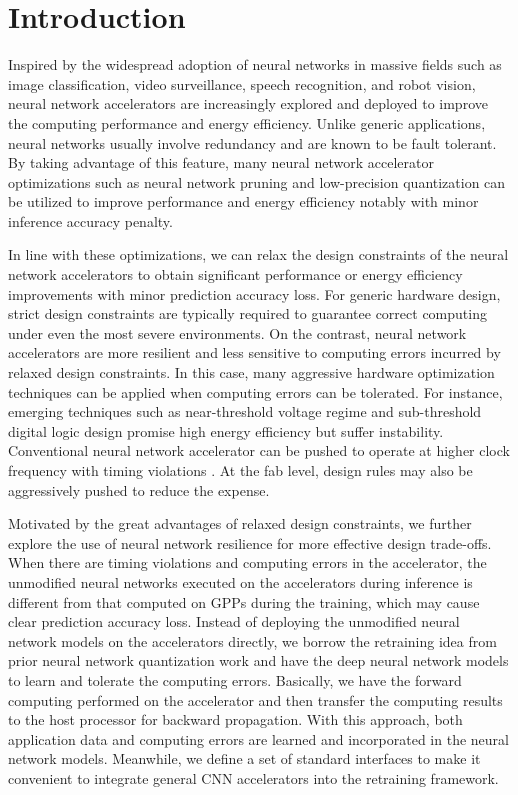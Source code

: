 \section{Introduction} \label{sec:intro}
Inspired by the widespread adoption of neural networks in massive fields such as image classification, 
video surveillance, speech recognition, and robot vision, neural network accelerators 
\cite{Zhang2015_9,Qiu2016_10,deepburing_12,DiCecco_4,Zeng2018_18} 
are increasingly explored and deployed to improve the computing performance and energy efficiency.
Unlike generic applications, neural networks usually involve redundancy and are known to be 
fault tolerant\cite{Reagen2016}. By taking advantage of this feature, many neural network accelerator optimizations 
such as neural network pruning and low-precision quantization can be utilized to improve 
performance and energy efficiency notably with minor inference accuracy penalty\cite{Han2016DeepCC}. 

In line with these optimizations, we can relax the design constraints of 
the neural network accelerators to obtain significant performance or energy efficiency 
improvements with minor prediction accuracy loss. 
For generic hardware design, strict design constraints are typically required to 
guarantee correct computing under even the most severe environments. On the contrast, 
neural network accelerators are more resilient and less sensitive to computing 
errors incurred by relaxed design constraints. In this case, many 
aggressive hardware optimization techniques can be applied when computing errors can be tolerated. 
For instance, emerging techniques such as  near-threshold voltage regime\cite{RG2010NT} 
and sub-threshold digital logic design\cite{BH2005,B2006} promise high energy efficiency 
but suffer instability\cite{Pu2010NT}. Conventional neural network accelerator 
can be pushed to operate at higher clock frequency with timing violations
\cite{overclock_3,Paceline_15}. At the fab level, design rules may also 
be aggressively pushed to reduce the expense. 

Motivated by the great advantages of relaxed design constraints,
we further explore the use of neural network resilience for more 
effective design trade-offs. When there are timing violations
and computing errors in the accelerator, the unmodified neural networks 
executed on the accelerators during inference is different 
from that computed on GPPs during the training, which may cause clear 
prediction accuracy loss. Instead of deploying the unmodified neural 
network models on the accelerators directly, we borrow the retraining 
idea from prior neural network quantization work \cite{Hwang2014_17,Matthieu2014_8} 
and have the deep neural network models to learn and tolerate the computing errors.  
Basically, we have the forward computing performed on the accelerator and 
then transfer the computing results to the host processor for 
backward propagation. With this approach, both application data and computing 
errors are learned and incorporated in the neural network models.  
Meanwhile, we define a set of standard interfaces to make it convenient 
to integrate general CNN accelerators into the retraining framework. 

